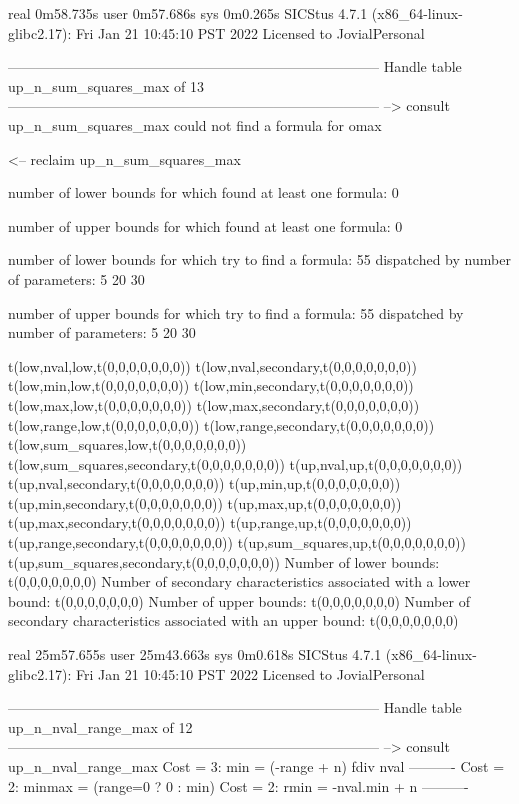 real	0m58.735s
user	0m57.686s
sys	0m0.265s
SICStus 4.7.1 (x86_64-linux-glibc2.17): Fri Jan 21 10:45:10 PST 2022
Licensed to JovialPersonal


--------------------------------------------------------------------------------
Handle table up_n_sum_squares_max of 13
--------------------------------------------------------------------------------
--> consult up_n_sum_squares_max
could not find a formula for omax

<-- reclaim up_n_sum_squares_max

number of lower bounds for which found at least one formula: 0

number of upper bounds for which found at least one formula: 0

number of lower bounds for which try to find a formula: 55
dispatched by number of parameters: 5  20  30

number of upper bounds for which try to find a formula: 55
dispatched by number of parameters: 5  20  30

t(low,nval,low,t(0,0,0,0,0,0,0))
t(low,nval,secondary,t(0,0,0,0,0,0,0))
t(low,min,low,t(0,0,0,0,0,0,0))
t(low,min,secondary,t(0,0,0,0,0,0,0))
t(low,max,low,t(0,0,0,0,0,0,0))
t(low,max,secondary,t(0,0,0,0,0,0,0))
t(low,range,low,t(0,0,0,0,0,0,0))
t(low,range,secondary,t(0,0,0,0,0,0,0))
t(low,sum_squares,low,t(0,0,0,0,0,0,0))
t(low,sum_squares,secondary,t(0,0,0,0,0,0,0))
t(up,nval,up,t(0,0,0,0,0,0,0))
t(up,nval,secondary,t(0,0,0,0,0,0,0))
t(up,min,up,t(0,0,0,0,0,0,0))
t(up,min,secondary,t(0,0,0,0,0,0,0))
t(up,max,up,t(0,0,0,0,0,0,0))
t(up,max,secondary,t(0,0,0,0,0,0,0))
t(up,range,up,t(0,0,0,0,0,0,0))
t(up,range,secondary,t(0,0,0,0,0,0,0))
t(up,sum_squares,up,t(0,0,0,0,0,0,0))
t(up,sum_squares,secondary,t(0,0,0,0,0,0,0))
Number of lower bounds:                                             t(0,0,0,0,0,0,0)
Number of secondary characteristics associated with a lower bound:  t(0,0,0,0,0,0,0)
Number of upper bounds:                                             t(0,0,0,0,0,0,0)
Number of secondary characteristics associated with an upper bound: t(0,0,0,0,0,0,0)

real	25m57.655s
user	25m43.663s
sys	0m0.618s
SICStus 4.7.1 (x86_64-linux-glibc2.17): Fri Jan 21 10:45:10 PST 2022
Licensed to JovialPersonal


--------------------------------------------------------------------------------
Handle table up_n_nval_range_max of 12
--------------------------------------------------------------------------------
--> consult up_n_nval_range_max
Cost =  3:  min    = (-range + n) fdiv nval
----------
Cost =  2:  minmax = (range=0 ? 0 : min)
Cost =  2:  rmin   = -nval.min + n
----------

